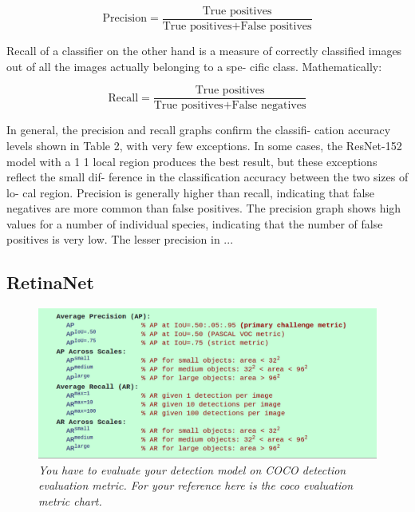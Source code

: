 \begin{equation}
\text{Precision} = \frac{\text{True positives}}{\text{True positives} + \text{False positives}}
\end{equation}

Recall of a classifier on the other hand is a measure of correctly classified images out of all the images actually belonging to a spe- cific class. Mathematically:

\begin{equation}
\text{Recall} = \frac{\text{True positives}}{\text{True positives} + \text{False negatives}}
\end{equation}

In general, the precision and recall graphs confirm the classifi- cation accuracy levels shown in Table 2, with very few exceptions. In some cases, the ResNet-152 model with a 1 1 local region produces the best result, but these exceptions reflect the small dif- ference in the classification accuracy between the two sizes of lo- cal region. Precision is generally higher than recall, indicating that false negatives are more common than false positives. The precision graph shows high values for a number of individual species, indicating that the number of false positives is very low. The lesser precision in ...

\subsection{RetinaNet}

\begin{figure}[h!]
\begin{center} 
\includegraphics[scale=0.35]{figures/coco}
\caption{\small \sl You have to evaluate your detection model on COCO detection evaluation metric. For your reference here is the coco evaluation metric chart. \label{fig:coco}}
\end{center}
\end{figure}

